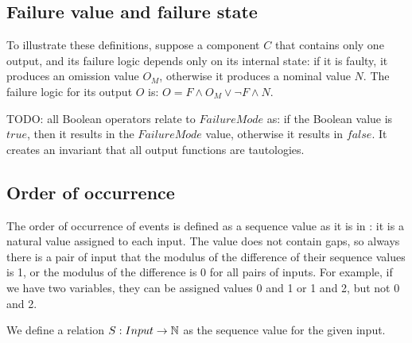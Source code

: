 
\subsection{Failure value and failure state}

%
%

To illustrate these definitions, suppose a component $C$ that contains only one output, and its failure logic depends only on its internal state: if it is faulty, it produces an omission value $O_M$, otherwise it produces a nominal value $N$. 
%
The failure logic for its output $O$ is: $O = F \land O_M \lor \lnot F \land N$.

TODO: all Boolean operators relate to $FailureMode$ as: if the Boolean value is $true$, then it results in the $FailureMode$ value, otherwise it results in $false$. It creates an invariant that all output functions are tautologies.

\subsection{Order of occurrence}

The order of occurrence of events is defined as a sequence value as it is in \HIPHOPS: it is a natural value assigned to each input.
%
The value does not contain gaps, so always there is a pair of input that the modulus of the difference of their sequence values is 1, or the modulus of the difference is 0 for all pairs of inputs.
%
For example, if we have two variables, they can be assigned values 0 and 1 or 1 and 2, but not 0 and 2. 

We define a relation $S : Input \rightarrow \mathbb{N} $ as the sequence value for the given input.

